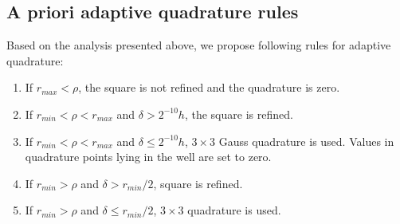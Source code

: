 \documentclass[preprint,12pt]{elsarticle}
\newcommand{\noteJB}[1]{{\color{Blue} \textbf{JB: } \textit{#1}}}
\newcommand{\notePE}[1]{{\color{Orange} \textbf{PE: } \textit{#1}}}
\begin{document}
\subsection{A priori adaptive quadrature rules}
Based on the analysis presented above, we propose following rules for adaptive quadrature:




\begin{enumerate}
 \item If $r_{max} < \rho$, the square is not refined and the quadrature is zero.
 \item If $r_{min} < \rho < r_{max}$ and $\delta > 2^{-10}h$, the square is refined.
 \item If $r_{min} < \rho < r_{max}$ and $\delta \le 2^{-10}h$, $3\times3$ Gauss quadrature is used.
 Values in quadrature points lying in the well are set to zero.
 \item If $r_{min} > \rho$ and $\delta > r_{min} / 2$, square is refined.
 \item If $r_{min} > \rho$ and $\delta \le r_{min} / 2$, $3\times3$ quadrature is used.
\end{enumerate}
\end{document}
